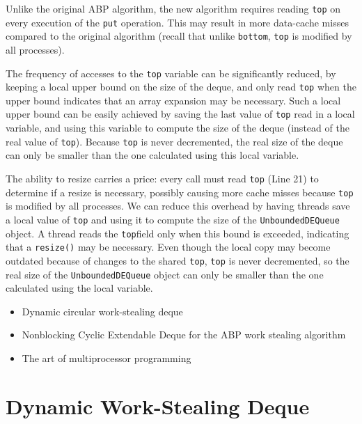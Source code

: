 
Unlike the original ABP algorithm, the new algorithm requires reading
\lstinline!top! on every execution of the \lstinline!put!
operation. This may result in more data-cache misses compared to the
original algorithm (recall that unlike \lstinline!bottom!,
\lstinline!top! is modified by all processes).

The frequency of accesses to the \lstinline!top! variable can be
significantly reduced, by keeping a local upper bound on the size of
the deque, and only read \lstinline!top! when the upper bound
indicates that an array expansion may be necessary. Such a local upper
bound can be easily achieved by saving the last value of
\lstinline!top! read in a local variable, and using this variable to
compute the size of the deque (instead of the real value of
\lstinline!top!). Because \lstinline!top! is never decremented, the
real size of the deque can only be smaller than the one calculated
using this local variable.


The ability to resize carries a price: every call must read
\lstinline!top! (Line 21) to determine if a resize is necessary,
possibly causing more cache misses because \lstinline!top!  is
modified by all processes. We can reduce this overhead by having
threads save a local value of \lstinline!top!  and using it to compute
the size of the \lstinline!UnboundedDEQueue!  object. A thread reads
the \lstinline!top!field only when this bound is exceeded, indicating
that a \lstinline!resize()! may be necessary.  Even though the local
copy may become outdated because of changes to the shared
\lstinline!top!, \lstinline!top! is never decremented, so the real
size of the \lstinline!UnboundedDEQueue! object can only be smaller
than the one calculated using the local variable.


\begin{itemize}
\item Dynamic circular work-stealing deque \cite{Chase2005}
\item Nonblocking Cyclic Extendable Deque for the ABP work stealing
  algorithm \cite{Lev2005}
\item The art of multiprocessor programming \cite{Herlihy2008}
\end{itemize}

\newpage
{}
\section{Dynamic Work-Stealing Deque}
\label{sec:queues-implementation-dynamic-ws-deque}

